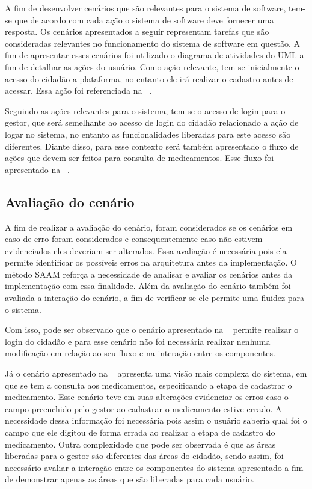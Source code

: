 A fim de desenvolver cenários que são relevantes para o sistema de software, tem-se que de acordo com cada ação o sistema de software deve fornecer uma resposta.
Os cenários apresentados a seguir representam tarefas que são consideradas relevantes no funcionamento do sistema de software em questão. A fim de apresentar esses cenários foi utilizado o diagrama de atividades do \acrfull{UML} a fim de detalhar as ações do usuário. Como ação relevante, tem-se inicialmente o acesso do cidadão a plataforma, no entanto ele irá realizar o cadastro antes de acessar. Essa ação foi referenciada na ~.

%


%

Seguindo as ações relevantes para o sistema, tem-se o acesso de login para o gestor, que será semelhante ao acesso de login do cidadão relacionado a  ação de logar no sistema, no entanto as funcionalidades liberadas para este acesso são diferentes. Diante disso, para esse contexto será também apresentado o fluxo de ações que devem ser feitos para consulta de medicamentos. Esse fluxo foi apresentado na ~.


\subsection{Avaliação do cenário}
A fim de realizar a avaliação do cenário, foram considerados se os cenários em caso de erro foram considerados e consequentemente caso não estivem evidenciados eles deveriam ser alterados. Essa avaliação é necessária pois ela permite identificar os possíveis erros na arquitetura antes da implementação. O método \acrfull{SAAM} reforça a necessidade de analisar e avaliar os cenários antes da implementação com essa finalidade. Além da avaliação do cenário também foi avaliada a interação do cenário, a fim de verificar se ele permite uma fluidez para o sistema.

Com isso, pode ser observado que o cenário apresentado na ~ permite realizar o login do cidadão e para esse cenário não foi necessária realizar nenhuma modificação em relação ao seu fluxo e na interação entre os componentes.

Já o cenário apresentado na ~ apresenta uma visão mais complexa do sistema, em que se tem a consulta aos medicamentos, especificando a etapa de cadastrar o medicamento. Esse cenário teve em suas alterações evidenciar os erros caso o campo preenchido pelo gestor ao cadastrar o medicamento estive errado.
A necessidade dessa informação foi necessária pois assim o usuário saberia qual foi o campo que ele digitou de forma errada ao realizar a etapa de cadastro do medicamento.
Outra complexidade que pode ser observada é que as áreas liberadas para o gestor são diferentes das áreas do cidadão, sendo assim, foi necessário avaliar a interação entre os componentes do sistema apresentado a fim de demonstrar apenas as áreas que são liberadas para cada usuário.

